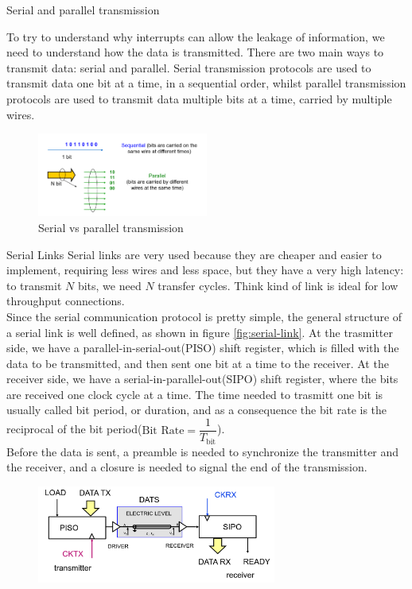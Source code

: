\begin{section}{Serial and parallel transmission}

  To try to understand why interrupts can allow the leakage of information, we need to understand
  how the data is transmitted. There are two main ways to transmit data: serial and parallel.
  Serial transmission protocols are used to transmit data one bit at a time, in a sequential order,
  whilst parallel transmission protocols are used to transmit data multiple bits at a time, carried
  by multiple wires. 
  \begin{figure}[H]
    \centering
    \includegraphics[width=0.5\textwidth]{img/hardware/pcb data transmission.png}
    \caption{Serial vs parallel transmission}
  \end{figure}
  \begin{subsection}{Serial Links}
    Serial links are very used because they are cheaper and easier to implement, requiring less wires 
    and less space, but they have a very high latency: to transmit $N$ bits, we need $N$ transfer
    cycles. Think kind of link is ideal for low throughput connections.\\
    Since the serial communication protocol is pretty simple, the general structure of a serial link
    is well defined, as shown in figure \ref{fig:serial-link}. At the trasmitter side, we have a 
    parallel-in-serial-out(PISO) shift register, which is filled with the data to be transmitted,
    and then sent one bit at a time to the receiver. At the receiver side, we have a
    serial-in-parallel-out(SIPO) shift register, where the bits are received one clock cycle at a time.
    The time needed to trasmitt one bit is usually called bit period, or duration, and as a
    consequence the bit rate is the reciprocal of the bit period($\text{Bit Rate} =
    \dfrac{1}{T_{\text{bit}}}$).\\
    Before the data is sent, a preamble is needed to synchronize the transmitter and the receiver,
    and a closure is needed to signal the end of the transmission. 
    \begin{figure}[H]
      \centering
      \includegraphics[width=0.7\textwidth]{img/hardware/serial link.png}

\end{figure}
\end{subsection}
\end{section}
